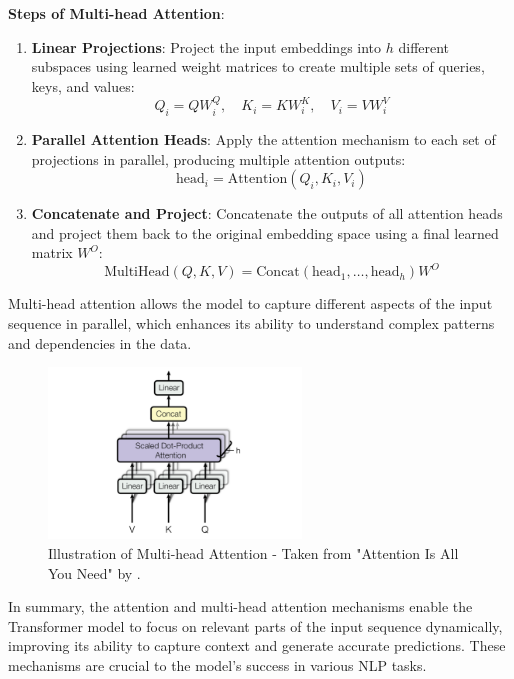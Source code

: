                 \textbf{Steps of Multi-head Attention}:
                \begin{enumerate}
                    \item \textbf{Linear Projections}: Project the input embeddings into \(h\) different subspaces using learned weight matrices to create multiple sets of queries, keys, and values:
                    \[
                    Q_i = QW_i^Q, \quad K_i = KW_i^K, \quad V_i = VW_i^V
                    \]

                    \item \textbf{Parallel Attention Heads}: Apply the attention mechanism to each set of projections in parallel, producing multiple attention outputs:
                    \[
                    \text{head}_i = \text{Attention}(Q_i, K_i, V_i)
                    \]

                    \item \textbf{Concatenate and Project}: Concatenate the outputs of all attention heads and project them back to the original embedding space using a final learned matrix \(W^O\):
                    \[
                    \text{MultiHead}(Q, K, V) = \text{Concat}(\text{head}_1, \ldots, \text{head}_h)W^O
                    \]
                \end{enumerate}
                Multi-head attention allows the model to capture different aspects of the input sequence in parallel, which enhances its ability to understand complex patterns and dependencies in the data.
                \begin{figure}[H]
                    \centering
                    \includegraphics[width=0.6\textwidth]{figs/Multi_head_attention.png}
                    \caption{Illustration of Multi-head Attention - Taken from "Attention Is All You Need" by \cite{vaswani2023attention}.}
                    \label{fig:multi_head_attention}
                \end{figure}
                In summary, the attention and multi-head attention mechanisms enable the Transformer model to focus on relevant parts of the input sequence dynamically, improving its ability to capture context and generate accurate predictions. These mechanisms are crucial to the model's success in various NLP tasks.
                                        
